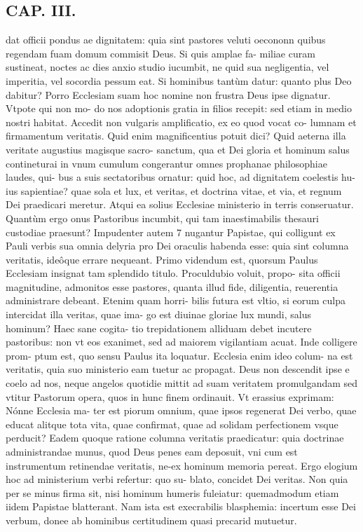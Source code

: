 \documentclass{article}
\begin{document}
\begin{pages}
\section*{CAP. III. }
\marginpar{[ p.39]}\pstart dat officii pondus ae dignitatem: quia sint pastores veluti oecononn quibus regendam fuam domum commisit Deus. Si quis amplae fa- miliae curam sustineat, noctes ac dies anxio studio iucumbit, ne quid sua negligentia, vel imperitia, vel socordia pessum eat. Si hominibus tantùm datur: quanto plus Deo dabitur? Porro Ecclesiam suam hoc nomine non frustra Deus ipse dignatur. Vtpote qui non mo- do nos adoptionis gratia in filios recepit: sed etiam in medio nostri habitat. Accedit non vulgaris amplificatio, ex eo quod vocat co- lumnam et firmamentum veritatis. Quid enim magnificentius potuit dici? Quid aeterna illa veritate augustius magisque sacro- sanctum, qua et Dei gloria et hominum salus contineturai in vnum cumulum congerantur omnes prophanae philosophiae laudes, qui- bus a suis sectatoribus ornatur: quid hoc, ad dignitatem coelestis hu- ius sapientiae? quae sola et lux, et veritas, et doctrina vitae, et via, et regnum Dei praedicari meretur. Atqui ea solius Ecclesiae ministerio in terris conseruatur. Quantùm ergo onus Pastoribus incumbit, qui tam inaestimabilis thesauri custodiae praesunt? Impudenter autem 7 nugantur Papistae, qui colligunt ex Pauli verbis sua omnia delyria pro Dei oraculis habenda esse: quia sint columna veritatis, ideôque errare nequeant. Primo videndum est, quorsum Paulus Ecclesiam insignat tam splendido titulo. Proculdubio voluit, propo- sita officii magnitudine, admonitos esse pastores, quanta illud fide, diligentia, reuerentia administrare debeant. Etenim quam horri- bilis futura est vltio, si eorum culpa intercidat illa veritas, quae ima- go est diuinae gloriae lux mundi, salus hominum? Haec sane cogita- tio trepidationem alliduam debet incutere pastoribus: non vt eos exanimet, sed ad maiorem vigilantiam acuat. Inde colligere prom- ptum est, quo sensu Paulus ita loquatur. Ecclesia enim ideo colum- na est veritatis, quia suo ministerio eam tuetur ac propagat. Deus non descendit ipse e coelo ad nos, neque angelos quotidie mittit ad suam veritatem promulgandam sed vtitur Pastorum opera, quos in hunc finem ordinauit. Vt erassius exprimam: Nónne Ecclesia ma- ter est piorum omnium, quae ipsos regenerat Dei verbo, quae educat alitque tota vita, quae confirmat, quae ad solidam perfectionem vsque perducit? Eadem quoque ratione columna veritatis praedicatur: quia doctrinae administrandae munus, quod Deus penes eam deposuit, vni cum est instrumentum retinendae veritatis, ne-ex hominum memoria pereat. Ergo elogium hoc ad ministerium verbi refertur: quo su- blato, concidet Dei veritas. Non quia per se minus firma sit, nisi hominum humeris fuleiatur: quemadmodum etiam iidem Papistae blatterant. Nam ista est execrabilis blasphemia: incertum esse Dei verbum, donee ab hominibus certitudinem quasi precarid mutuetur.  \pend

\end{pages}
\end{document}

